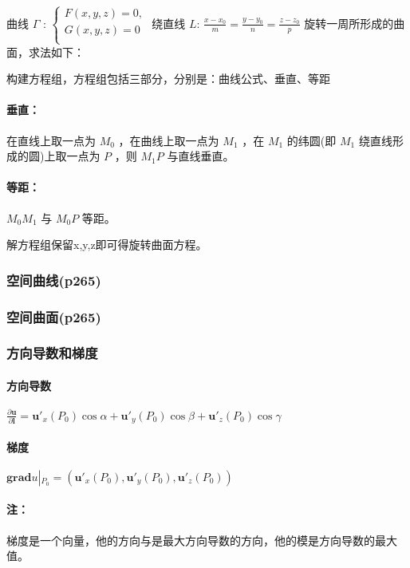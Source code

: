 ﻿\documentclass[a4paper,12pt,UTF8]{ctexart}
\begin{document}
    曲线 \(\varGamma\) : 
    \(\begin{cases}
        F(x,y,z)=0,\\
        G(x,y,z)=0\\
    \end{cases} \)
    绕直线 \(L\): \(\frac{x-x_0}{m}=\frac{y-y_0}{n}=\frac{z-z_0}{p}\) 旋转一周所形成的曲面，求法如下：

    构建方程组，方程组包括三部分，分别是：曲线公式、垂直、等距

    \paragraph{垂直：} 在直线上取一点为 \(M_0\) ，在曲线上取一点为 \(M_1\) ，在 \(M_1\) 的纬圆(即 \(M_1\) 绕直线形成的圆)上取一点为 \(P\) ，则 \(M_1P\) 与直线垂直。
    \paragraph{等距：} \(M_0M_1\) 与 \(M_0P\) 等距。

    解方程组保留x,y,z即可得旋转曲面方程。
    
    \subsubsection{空间曲线(p265)}
    
    \subsubsection{空间曲面(p265)}
    
    \subsubsection{方向导数和梯度}
    \paragraph{方向导数} \(\frac{\partial \mathbf{u}}{\partial \mathbf{l}}= \mathbf{u}'_x(P_0)\cos \alpha + \mathbf{u}'_y(P_0)\cos \beta + \mathbf{u}'_z(P_0)\cos \gamma\)
    \paragraph{梯度} \(\mathbf{grad} u \left|_{P_0}\right. = \left(\mathbf{u}'_x(P_0), \mathbf{u}'_y(P_0), \mathbf{u}'_z(P_0)\right)\)
    \paragraph{注：} 梯度是一个向量，他的方向与是最大方向导数的方向，他的模是方向导数的最大值。
        
\end{document}
